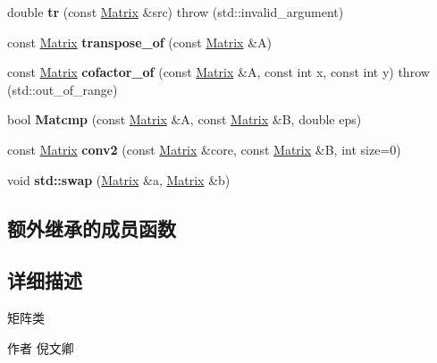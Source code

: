 \begin{DoxyCompactItemize}
double {\bfseries tr} (const \hyperlink{classkerbal_1_1math_1_1_matrix}{Matrix} \&src)  throw (std\+::invalid\+\_\+argument)
\item 
\mbox{\label{classkerbal_1_1math_1_1_matrix_aca59235f2426e023a982b2424c116a12}} 
const \hyperlink{classkerbal_1_1math_1_1_matrix}{Matrix} {\bfseries transpose\+\_\+of} (const \hyperlink{classkerbal_1_1math_1_1_matrix}{Matrix} \&A)
\item 
\mbox{\label{classkerbal_1_1math_1_1_matrix_a0e0f686216ed93f7a1c962006a0c7ff1}} 
const \hyperlink{classkerbal_1_1math_1_1_matrix}{Matrix} {\bfseries cofactor\+\_\+of} (const \hyperlink{classkerbal_1_1math_1_1_matrix}{Matrix} \&A, const int x, const int y)  throw (std\+::out\+\_\+of\+\_\+range)
\item 
\mbox{\label{classkerbal_1_1math_1_1_matrix_a17b7efc841868072cabb906fb2ee0a3a}} 
bool {\bfseries Matcmp} (const \hyperlink{classkerbal_1_1math_1_1_matrix}{Matrix} \&A, const \hyperlink{classkerbal_1_1math_1_1_matrix}{Matrix} \&B, double eps)
\item 
\mbox{\label{classkerbal_1_1math_1_1_matrix_a6f53d61daeba794daa792db83f92a8e2}} 
const \hyperlink{classkerbal_1_1math_1_1_matrix}{Matrix} {\bfseries conv2} (const \hyperlink{classkerbal_1_1math_1_1_matrix}{Matrix} \&core, const \hyperlink{classkerbal_1_1math_1_1_matrix}{Matrix} \&B, int size=0)
\item 
\mbox{\label{classkerbal_1_1math_1_1_matrix_a13d83eac9b443b09ea698e9e9d0b3848}} 
void {\bfseries std\+::swap} (\hyperlink{classkerbal_1_1math_1_1_matrix}{Matrix} \&a, \hyperlink{classkerbal_1_1math_1_1_matrix}{Matrix} \&b)
\end{DoxyCompactItemize}
\subsection*{额外继承的成员函数}


\subsection{详细描述}
矩阵类 

\begin{DoxyAuthor}{作者}
倪文卿 
\end{DoxyAuthor}


